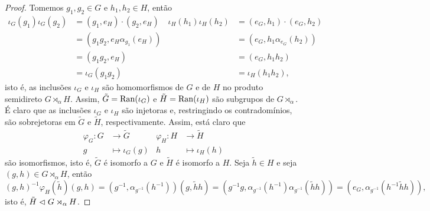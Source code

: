 \begin{proof}
    Tomemos \(g_1, g_2 \in G\) e \(h_1, h_2 \in H\), então
    \begin{align*}
        \iota_G(g_1)\iota_G(g_2) &= (g_1, e_H) \cdot (g_2, e_H)&
        \iota_H(h_1)\iota_H(h_2) &= (e_G, h_1)\cdot(e_G, h_2)\\
                                 &= (g_1g_2, e_H \alpha_{g_1}(e_H))&
                                 &= (e_G, h_1 \alpha_{e_G}(h_2))\\
                                 &= (g_1g_2, e_H)&
                                 &= (e_G, h_1 h_2)\\
                                 &= \iota_G(g_1g_2)&
                                 &= \iota_H(h_1h_2),
    \end{align*}
    isto é, as inclusões \(\iota_G\) e \(\iota_H\) são homomorfismos de \(G\) e de \(H\) no produto semidireto \(G \rtimes_{\alpha} H\). Assim, \(\tilde{G} = \operatorname{Ran}(\iota_G)\) e \(\tilde{H} = \operatorname{Ran}(\iota_H)\) são subgrupos de \(G \rtimes_{\alpha}\). É claro que as inclusões \(\iota_G\) e \(\iota_H\) são injetoras e, restringindo os contradomínios, são sobrejetoras em \(\tilde{G}\) e \(\tilde{H}\), respectivamente. Assim, está claro que
    \begin{align*}
        \varphi_G : G &\to \tilde{G}&
        \varphi_H : H &\to \tilde{H}\\
                    g &\mapsto \iota_G(g)&
                    h &\mapsto \iota_H(h)
    \end{align*}
    são isomorfismos, isto é, \(\tilde{G}\) é isomorfo a \(G\) e \(\tilde{H}\) é isomorfo a \(H\). Seja \(\tilde{h} \in H\) e seja \((g, h) \in G \rtimes_{\alpha} H\), então
    \begin{equation*}
        (g, h)^{-1} \varphi_H(\tilde{h}) (g, h) = \left(g^{-1}, \alpha_{g^{-1}}(h^{-1})\right) (g, \tilde{h}h) = \left(g^{-1}g, \alpha_{g^{-1}}(h^{-1}) \alpha_{g^{-1}}(\tilde{h}h)\right) = \left(e_G,\alpha_{g^{-1}} (h^{-1} \tilde{h} h)\right),
    \end{equation*}
    isto é, \(\tilde{H} \vartriangleleft G \rtimes_{\alpha} H\).


\end{proof}
